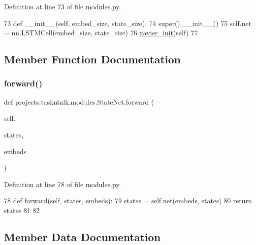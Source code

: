 Definition at line 73 of file modules.\+py.


\begin{DoxyCode}
73     \textcolor{keyword}{def }\_\_init\_\_(self, embed\_size, state\_size):
74         super().\_\_init\_\_()
75         self.net = nn.LSTMCell(embed\_size, state\_size)
76         \hyperlink{namespaceprojects_1_1taskntalk_1_1modules_a483197f0d561a3d1ef7d04a2de70e571}{xavier\_init}(self)
77 
\end{DoxyCode}


\subsection{Member Function Documentation}
\mbox{\label{classprojects_1_1taskntalk_1_1modules_1_1StateNet_a3305ceee97d7761dd2417ad776cf046f}} 
\subsubsection{\texorpdfstring{forward()}{forward()}}
{\footnotesize\ttfamily def projects.\+taskntalk.\+modules.\+State\+Net.\+forward (\begin{DoxyParamCaption}\item[{}]{self,  }\item[{}]{states,  }\item[{}]{embeds }\end{DoxyParamCaption})}



Definition at line 78 of file modules.\+py.


\begin{DoxyCode}
78     \textcolor{keyword}{def }forward(self, states, embeds):
79         states = self.net(embeds, states)
80         \textcolor{keywordflow}{return} states
81 
82 
\end{DoxyCode}


\subsection{Member Data Documentation}
\mbox{\label{classprojects_1_1taskntalk_1_1modules_1_1StateNet_a4499c3c6f15bc68c514202ed019f4eff}} 
